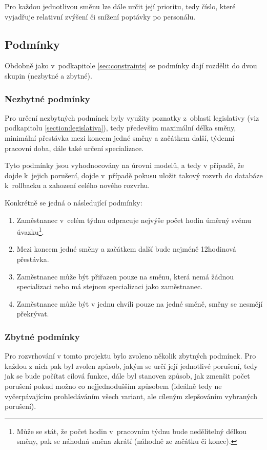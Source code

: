\documentclass[twoside]{ctuthesis}
\begin{document}
Pro každou jednotlivou směnu lze dále určit její prioritu, tedy číslo, které vyjadřuje relativní zvýšení či snížení poptávky po personálu.

\subsection{Podmínky}
Obdobně jako v~podkapitole \ref{sec:constraints} se podmínky dají rozdělit do dvou skupin (nezbytné a zbytné).

\subsubsection{Nezbytné podmínky}
Pro určení nezbytných podmínek byly využity poznatky z~oblasti legislativy (viz podkapitolu \ref{section:legislativa}), tedy především maximální délka směny, minimální přestávka mezi koncem jedné směny a začátkem další, týdenní pracovní doba, dále také určení specializace.

Tyto podmínky jsou vyhodnocovány na úrovni modelů, a tedy v případě, že dojde k~jejich porušení, dojde v~případě pokusu uložit takový rozvrh do databáze k~rollbacku a zahození celého nového rozvrhu.

Konkrétně se jedná o následující podmínky:

\begin{enumerate}
	\item Zaměstnanec v~celém týdnu odpracuje nejvýše počet hodin úměrný svému úvazku\footnote{Může se stát, že počet hodin v~pracovním týdnu bude nedělitelný délkou směny, pak se náhodná směna zkrátí (náhodně ze začátku či konce).}.
	\item Mezi koncem jedné směny a začátkem další bude nejméně 12hodinová přestávka.
	\item Zaměstnanec může být přiřazen pouze na směnu, která nemá žádnou specializaci nebo má stejnou specializaci jako zaměstnanec.
	\item Zaměstnanec může být v jednu chvíli pouze na jedné směně, směny se nesmějí překrývat.
\end{enumerate}

\subsubsection{Zbytné podmínky}
Pro rozvrhování v tomto projektu bylo zvoleno několik zbytných podmínek. Pro každou z nich pak byl zvolen způsob, jakým se určí její jednotlivé porušení, tedy jak se bude počítat cílová funkce, dále byl stanoven způsob, jak zmenšit počet porušení pokud možno co nejjednodušším způsobem (ideálně tedy ne vyčerpávajícím prohledáváním všech variant, ale cíleným zlepšováním vybraných porušení).
\end{document}
